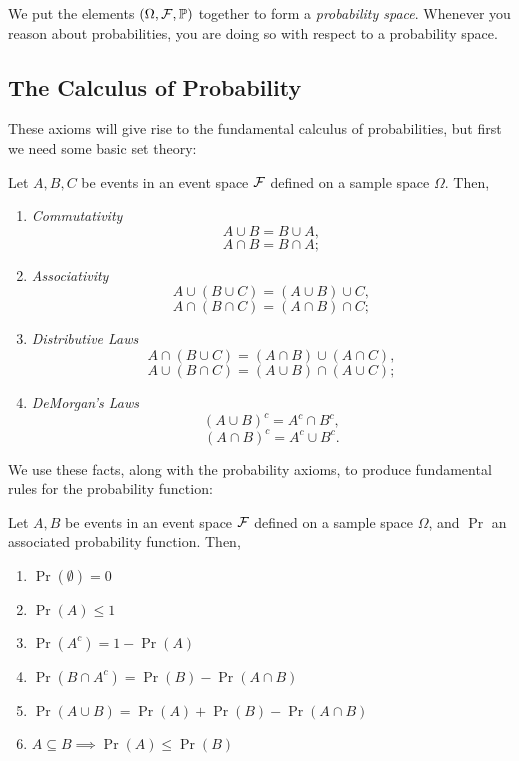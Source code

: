 We put the elements $(\Omega, \mathcal F, \operatorname*{\mathbb{P}})$ together to form a 
\emph{probability space}. Whenever you reason about probabilities, 
you are doing so with respect to a probability space.

\subsection{The Calculus of Probability}

These axioms will give rise to the fundamental 
calculus of probabilities, but first we need some basic set theory:

\begin{theorem}[C\&B Theorem 1.1.4]
    Let $A,B,C$ be events in an event space $\mathcal F$ defined on a sample 
    space $\Omega$. Then, 

    \begin{enumerate}[label=(\alph*)]
        \item \textit{Commutativity} \[ A \cup B = B \cup A, \]
        \[ A \cap B = B \cap A; \]
        \item \textit{Associativity} \[ A \cup (B \cup C) = (A \cup B) \cup C, \]
        \[ A \cap (B \cap C) = (A \cap B) \cap C; \]
        \item \textit{Distributive Laws} \[ A \cap (B \cup C) = (A \cap B) \cup (A \cap C), \]
        \[ A \cup (B \cap C) = (A \cup B) \cap (A \cup C); \]
        \item \textit{DeMorgan's Laws} \[ (A \cup B)^c = A^c \cap B^c, \]
        \[ (A \cap B)^c = A^c \cup B^c. \]
    \end{enumerate}
\end{theorem}

We use these facts, along with the probability axioms, to produce fundamental 
rules for the probability function:

\begin{theorem}[C\&B Theorems 1.8 \& 1.9]
    \label{thm:1.8_1.9}
    Let $A,B$ be events in an event space $\mathcal F$ defined on a sample 
    space $\Omega$, and $\Pr$ an associated probability function.
    Then,
    \begin{enumerate}[label=(\alph*)]
        \item $\Pr(\emptyset) = 0$
        \item $\Pr(A) \leq 1$
        \item $\Pr(A^c) = 1 - \Pr(A)$
        \item $\Pr(B \cap A^c) = \Pr(B) - \Pr(A \cap B)$
        \item $\Pr(A \cup B) = \Pr(A) + \Pr(B) - \Pr(A \cap B)$
        \item $A \subseteq B \implies \Pr(A) \leq \Pr(B)$ 
    \end{enumerate}
\end{theorem}

